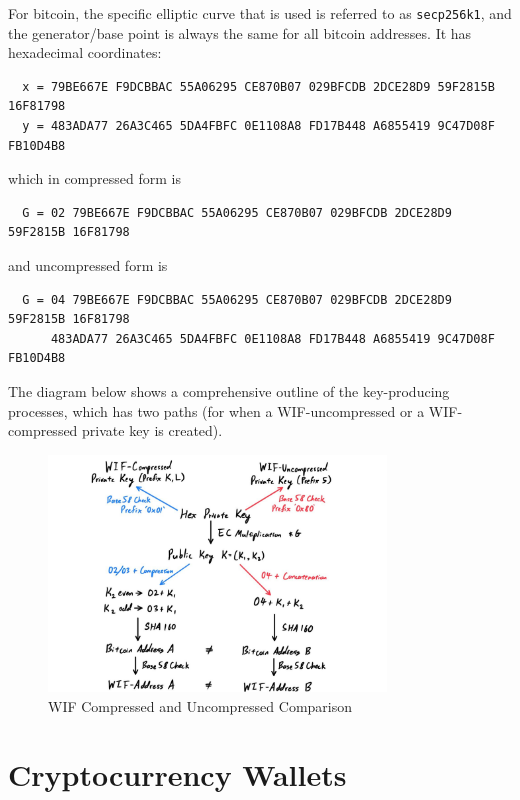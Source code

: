 \documentclass{article}
\begin{document}
  For bitcoin, the specific elliptic curve that is used is referred to as \texttt{secp256k1}, and the generator/base point is always the same for all bitcoin addresses. It has hexadecimal coordinates:

  \begin{lstlisting}
  x = 79BE667E F9DCBBAC 55A06295 CE870B07 029BFCDB 2DCE28D9 59F2815B 16F81798
  y = 483ADA77 26A3C465 5DA4FBFC 0E1108A8 FD17B448 A6855419 9C47D08F FB10D4B8
  \end{lstlisting}

  which in compressed form is

  \begin{lstlisting}
  G = 02 79BE667E F9DCBBAC 55A06295 CE870B07 029BFCDB 2DCE28D9 59F2815B 16F81798
  \end{lstlisting}

  and uncompressed form is

  \begin{lstlisting}
  G = 04 79BE667E F9DCBBAC 55A06295 CE870B07 029BFCDB 2DCE28D9 59F2815B 16F81798 
      483ADA77 26A3C465 5DA4FBFC 0E1108A8 FD17B448 A6855419 9C47D08F FB10D4B8
  \end{lstlisting}

  The diagram below shows a comprehensive outline of the key-producing processes, which has two paths (for when a WIF-uncompressed or a WIF-compressed private key is created).

  \begin{figure}[H]
  \centering
  \includegraphics[width=0.8\textwidth]{img/WIF_Com_Uncom_Comparison.jpg}
  \caption{WIF Compressed and Uncompressed Comparison}
  \end{figure}

\section{Cryptocurrency Wallets}
\end{document}

